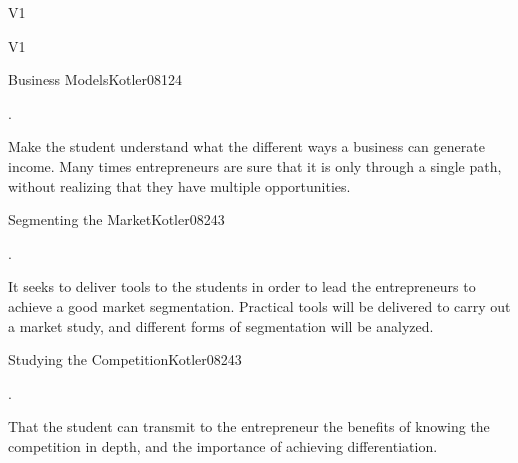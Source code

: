 \begin{syllabus}
\begin{outcomes}{V1}
    \item {}
    \item {}
\end{outcomes}

\begin{competences}{V1}
    \item {}
\end{competences}

\begin{unit}{Business Models}{}{Kotler08}{12}{4}
   \begin{topics}
      \item .
   \end{topics}

   \begin{learningoutcomes}
      \item Make the student understand what the different ways a business can generate income. Many times entrepreneurs are sure that it is only through a single path, without realizing that they have multiple opportunities.
   \end{learningoutcomes}

\end{unit}

\begin{unit}{Segmenting the Market}{}{Kotler08}{24}{3}
   \begin{topics}
      \item .
   \end{topics}

   \begin{learningoutcomes}
      \item It seeks to deliver tools to the students in order to lead the entrepreneurs to achieve a good market segmentation. Practical tools will be delivered to carry out a market study, and different forms of segmentation will be analyzed.
   \end{learningoutcomes}

\end{unit}

\begin{unit}{Studying the Competition}{}{Kotler08}{24}{3}
   \begin{topics}
      \item .
   \end{topics}

   \begin{learningoutcomes}
      \item That the student can transmit to the entrepreneur the benefits of knowing the competition in depth, and the importance of achieving differentiation.
   \end{learningoutcomes}


\end{unit}
\end{syllabus}

